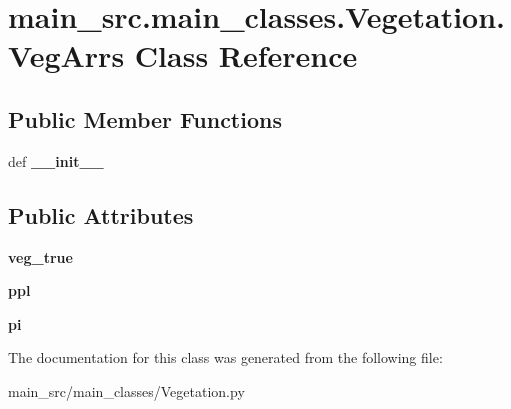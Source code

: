 \hypertarget{classmain__src_1_1main__classes_1_1Vegetation_1_1VegArrs}{\section{main\-\_\-src.\-main\-\_\-classes.\-Vegetation.\-Veg\-Arrs Class Reference}
\label{classmain__src_1_1main__classes_1_1Vegetation_1_1VegArrs}
}
\subsection*{Public Member Functions}
\begin{DoxyCompactItemize}
\item 
\hypertarget{classmain__src_1_1main__classes_1_1Vegetation_1_1VegArrs_a51e83a2844827f2b18ad3b91afae33c8}{def {\bfseries \-\_\-\-\_\-init\-\_\-\-\_\-}}\label{classmain__src_1_1main__classes_1_1Vegetation_1_1VegArrs_a51e83a2844827f2b18ad3b91afae33c8}

\end{DoxyCompactItemize}
\subsection*{Public Attributes}
\begin{DoxyCompactItemize}
\item 
\hypertarget{classmain__src_1_1main__classes_1_1Vegetation_1_1VegArrs_a6c34520ffd717e802e10d4528ec88a1a}{{\bfseries veg\-\_\-true}}\label{classmain__src_1_1main__classes_1_1Vegetation_1_1VegArrs_a6c34520ffd717e802e10d4528ec88a1a}

\item 
\hypertarget{classmain__src_1_1main__classes_1_1Vegetation_1_1VegArrs_ae137d42e879f85231e6a6dbcea68d4f9}{{\bfseries ppl}}\label{classmain__src_1_1main__classes_1_1Vegetation_1_1VegArrs_ae137d42e879f85231e6a6dbcea68d4f9}

\item 
\hypertarget{classmain__src_1_1main__classes_1_1Vegetation_1_1VegArrs_a4aeb99043cda905e4017ddad936bc54d}{{\bfseries pi}}\label{classmain__src_1_1main__classes_1_1Vegetation_1_1VegArrs_a4aeb99043cda905e4017ddad936bc54d}

\end{DoxyCompactItemize}


The documentation for this class was generated from the following file\-:\begin{DoxyCompactItemize}
\item 
main\-\_\-src/main\-\_\-classes/Vegetation.\-py\end{DoxyCompactItemize}
